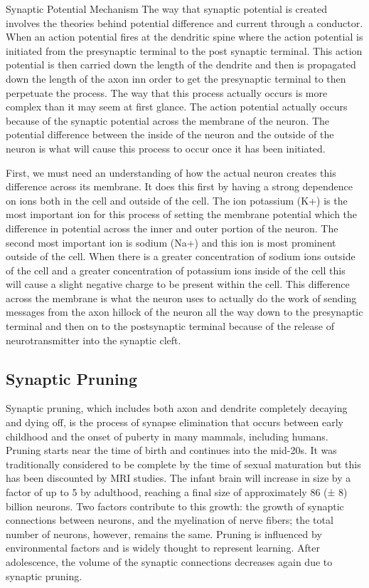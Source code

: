 Synaptic Potential Mechanism
The way that synaptic potential is created involves the theories behind potential difference and current through a conductor. When an action potential fires at the dendritic spine where the action potential is initiated from the presynaptic terminal to the post synaptic terminal. This action potential is then carried down the length of the dendrite and then is propagated down the length of the axon inn order to get the presynaptic terminal to then perpetuate the process. The way that this process actually occurs is more complex than it may seem at first glance. The action potential actually occurs because of the synaptic potential across the membrane of the neuron. The potential difference between the inside of the neuron and the outside of the neuron is what will cause this process to occur once it has been initiated.

First, we must need an understanding of how the actual neuron creates this difference across its membrane. It does this first by having a strong dependence on ions both in the cell and outside of the cell. The ion potassium (K+) is the most important ion for this process of setting the membrane potential which the difference in potential across the inner and outer portion of the neuron. The second most important ion is sodium (Na+) and this ion is most prominent outside of the cell. When there is a greater concentration of sodium ions outside of the cell and a greater concentration of potassium ions inside of the cell this will cause a slight negative charge to be present within the cell. This difference across the membrane is what the neuron uses to actually do the work of sending messages from the axon hillock of the neuron all the way down to the presynaptic terminal and then on to the postsynaptic terminal because of the release of neurotransmitter into the synaptic cleft.

\hypertarget{synaptic-pruning}{%
\subsection{Synaptic Pruning}\label{synaptic-pruning}}

Synaptic pruning, which includes both axon and dendrite completely decaying and dying off, is the process of synapse elimination that occurs between early childhood and the onset of puberty in many mammals, including humans. Pruning starts near the time of birth and continues into the mid-20s. It was traditionally considered to be complete by the time of sexual maturation but this has been discounted by MRI studies. The infant brain will increase in size by a factor of up to 5 by adulthood, reaching a final size of approximately 86 (± 8) billion neurons. Two factors contribute to this growth: the growth of synaptic connections between neurons, and the myelination of nerve fibers; the total number of neurons, however, remains the same. Pruning is influenced by environmental factors and is widely thought to represent learning. After adolescence, the volume of the synaptic connections decreases again due to synaptic pruning.

